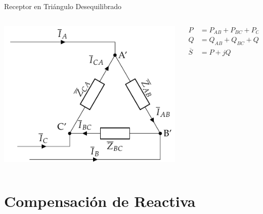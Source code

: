 \documentclass[aspectratio=169, usenames,svgnames,dvipsnames]{beamer}
\begin{document}
\begin{frame}[label={sec:org989fea2}]{Receptor en Triángulo Desequilibrado}
\begin{columns}
\begin{column}{0.6\columnwidth}
\begin{center}
\includegraphics[width=.9\linewidth]{../figs/TrianguloDesequilibrado_Receptor.pdf}
\end{center}
\end{column}

\begin{column}{0.4\columnwidth}
\begin{align*}
  P &= P_{AB} + P_{BC} + P_{CA}\\
  Q &= Q_{AB} + Q_{BC} + Q_{CA}\\
  \overline{S} &= P + jQ
\end{align*}
\end{column}
\end{columns}
\end{frame}

\section{Compensación de Reactiva}
\label{sec:org9ddc592}
\end{document}
